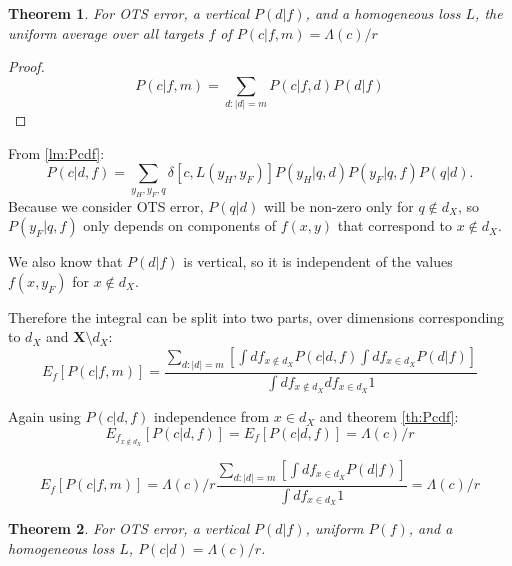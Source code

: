 \documentclass[a4paper]{article}
\newtheorem{theorem}{Theorem}[section]
\begin{document}
\begin{theorem}
  For \gls{OTS error}, a \gls{vertical} $P\left(d|f\right)$, and a homogeneous
  loss $L$, the uniform average over all targets $f$ of
  $P\left(c|f, m\right) = \Lambda(c)/r$
  \label{th:Pcfm}
\end{theorem}

\begin{proof}
  \begin{equation}
    P\left(c|f,m\right) = \sum_{d:|d|=m} P\left(c|f,d\right)P\left(d|f\right)
  \end{equation}
\end{proof}

From \ref{lm:Pcdf}:
\begin{equation}
  P(c|d,f) = \sum_{y_H,y_F,q}\delta\left[c,L\left(y_H, y_F\right)\right] P\left(y_H|q, d\right)
  P\left(y_F| q, f\right)P\left(q|d\right).
\end{equation}
Because we consider OTS error, $P\left(q|d\right)$ will be non-zero
only for $q \notin d_X$, so $P\left(y_F| q, f\right)$ only depends on
components of $f(x,y)$ that correspond to $x\notin d_X$.

We also know that $P\left(d|f\right)$ is vertical, so it is
independent of the values $f(x,y_F)$ for $x \notin d_X$.

Therefore the integral can be split into two parts, over dimensions
corresponding to $d_X$ and $\mathbf{X} \setminus d_X$:
\begin{equation}
  E_f \left[P\left(c|f,m\right)\right] = \frac{\sum_{d:|d|=m}
    \left[\int df_{x\notin d_X} P\left(c|d,f \right)
      \int df_{x \in d_X} P\left(d|f\right)\right]}{\int df_{x\notin d_X} df_{x \in d_X} 1}
\end{equation}

Again using $P\left(c|d, f\right)$ independence from $x\in d_X$ and theorem \ref{th:Pcdf}:
\begin{equation}
  E_{f_{x\notin d_X}} \left[P\left(c|d, f\right)\right] = E_f \left[P\left(c|d, f\right)\right] = 
  \Lambda(c)/r
\end{equation}

\begin{equation}
  E_f \left[P\left(c|f,m\right)\right] = \Lambda(c)/r \frac{\sum_{d:|d|=m}
    \left[\int df_{x \in d_X} P\left(d|f\right)\right]}{\int df_{x \in d_X} 1} =
  \Lambda(c)/r
\end{equation}

\begin{theorem}
  For OTS error, a vertical $P(d|f)$, uniform $P(f)$, and a
  homogeneous loss $L$, $P(c|d) = \Lambda(c)/r$.
  \label{Pcd}
\end{theorem}
\end{document}
